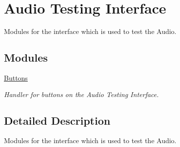 \hypertarget{group___doc_a_t_i}{}\section{Audio Testing Interface}
\label{group___doc_a_t_i}


Modules for the interface which is used to test the Audio.  


\subsection*{Modules}
\begin{DoxyCompactItemize}
\item 
\hyperlink{group___doc_a_t_i_buttons}{Buttons}
\begin{DoxyCompactList}\small\item\em Handler for buttons on the Audio Testing Interface. \end{DoxyCompactList}\end{DoxyCompactItemize}


\subsection{Detailed Description}
Modules for the interface which is used to test the Audio. 

